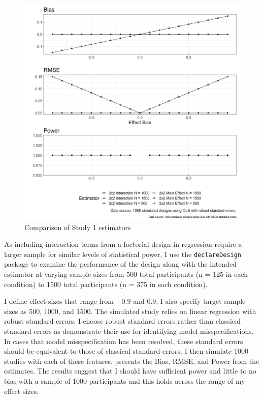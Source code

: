 \documentclass[12pt]{article}
\begin{document}
\begin{figure}[H]
     \includegraphics[width = 175mm]{../../figures/study_1_diagnoses.jpeg}
     \caption{Comparison of Study 1 estimators}
     \label{fig:study}
\end{figure}

As including interaction terms from a factorial design in regression require a larger sample for similar levels of statistical power, I use the \verb|declareDesign| package \citep{blair_et-al_2022_fabricatr} to examine the performance of the design along with the intended estimator at varying sample sizes from 500 total participants (n = 125 in each condition) to 1500 total participants (n = 375 in each condition). 

I define effect sizes that range from $-0.9$ and $0.9$. I also specify target sample sizes as $500$, $1000$, and $1500$. The simulated study relies on linear regression with robust standard errors. I choose robust standard errors rather than classical standard errors as \citet{king_roberts_2015_pa} demonstrate their use for identifying model misspecifications. In cases that model misspecification has been resolved, these standard errors should be equivalent to those of classical standard errors. I then simulate $1000$ studies with each of these features.  presents the Bias, RMSE, and Power from the estimates. The results suggest that I should have sufficient power and little to no bias with a sample of $1000$ participants and this holds across the range of my effect sizes.
\end{document}

